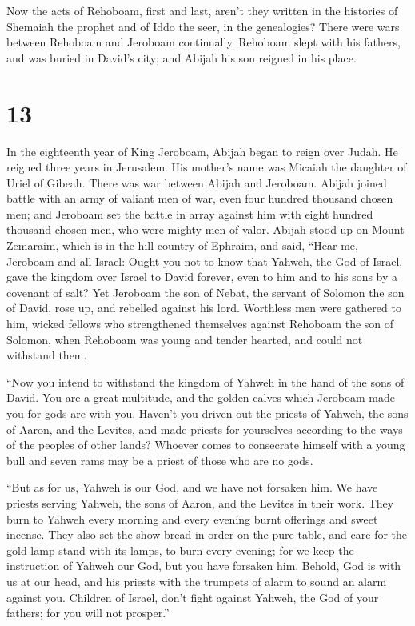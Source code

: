  Now the acts of Rehoboam, first and last, aren't they
written in the histories of Shemaiah the prophet and of Iddo the seer,
in the genealogies? There were wars between Rehoboam and Jeroboam
continually.  Rehoboam slept with his fathers, and was
buried in David's city; and Abijah his son reigned in his place.

\hypertarget{section-12}{%
\section{13}\label{section-12}}

 In the eighteenth year of King Jeroboam, Abijah began to
reign over Judah.  He reigned three years in Jerusalem.
His mother's name was Micaiah the daughter of Uriel of Gibeah. There was
war between Abijah and Jeroboam.  Abijah joined battle
with an army of valiant men of war, even four hundred thousand chosen
men; and Jeroboam set the battle in array against him with eight hundred
thousand chosen men, who were mighty men of valor.  Abijah
stood up on Mount Zemaraim, which is in the hill country of Ephraim, and
said, ``Hear me, Jeroboam and all Israel:  Ought you not
to know that Yahweh, the God of Israel, gave the kingdom over Israel to
David forever, even to him and to his sons by a covenant of salt?
 Yet Jeroboam the son of Nebat, the servant of Solomon the
son of David, rose up, and rebelled against his lord. 
Worthless men were gathered to him, wicked fellows who strengthened
themselves against Rehoboam the son of Solomon, when Rehoboam was young
and tender hearted, and could not withstand them.

 ``Now you intend to withstand the kingdom of Yahweh in
the hand of the sons of David. You are a great multitude, and the golden
calves which Jeroboam made you for gods are with you. 
Haven't you driven out the priests of Yahweh, the sons of Aaron, and the
Levites, and made priests for yourselves according to the ways of the
peoples of other lands? Whoever comes to consecrate himself with a young
bull and seven rams may be a priest of those who are no gods.

 ``But as for us, Yahweh is our God, and we have not
forsaken him. We have priests serving Yahweh, the sons of Aaron, and the
Levites in their work.  They burn to Yahweh every morning
and every evening burnt offerings and sweet incense. They also set the
show bread in order on the pure table, and care for the gold lamp stand
with its lamps, to burn every evening; for we keep the instruction of
Yahweh our God, but you have forsaken him.  Behold, God
is with us at our head, and his priests with the trumpets of alarm to
sound an alarm against you. Children of Israel, don't fight against
Yahweh, the God of your fathers; for you will not prosper.''

